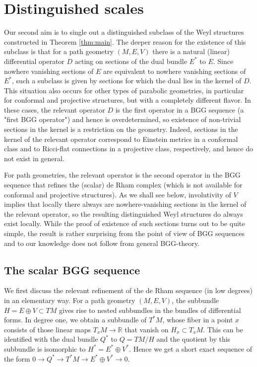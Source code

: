 \documentclass[11pt]{amsart}
\numberwithin{proposition}{section}
\numberwithin{equation}{section}
\begin{document}
\section{Distinguished scales}\label{distinguished}
Our second aim is to single out a distinguished subclass of the Weyl structures constructed in Theorem \ref{thm:main}. The deeper reason for the existence of this subclass is that for a path geometry $(M,E,V)$ there is a natural (linear) differential operator $D$ acting on sections of the dual bundle $E^*$ to $E$. Since nowhere vanishing sections of $E$ are equivalent to nowhere vanishing sections of $E^*$, such a subclass is given by sections for which the dual lies in the kernel of $D$. This situation also occurs for other types of parabolic geometries, in particular for conformal and projective structures, but with a completely different flavor. In these cases, the relevant operator $D$ is the first operator in a BGG sequence (a "first BGG operator") and hence is overdetermined, so existence of non-trivial sections in the kernel is a restriction on the geometry. Indeed, sections in the kernel of the relevant operator correspond to Einstein metrics in a conformal class and to Ricci-flat connections in a projective class, respectively, and hence do not exist in general. 

For path geometries, the relevant operator is the second operator in the BGG sequence that refines the (scalar) de Rham complex (which is not available for conformal and projective structures). As we shall see below, involutivity of $V$ implies that locally there always are nowhere-vanishing sections in the kernel of the relevant operator, so the resulting distinguished Weyl structures do always exist locally. While the proof of existence of such sections turns out to be quite simple, the result is rather surprising from the point of view of BGG sequences and to our knowledge does not follow from general BGG-theory. 

\subsection{The scalar BGG sequence}\label{BGG}
We first discuss the relevant refinement of the de Rham sequence (in low degrees) in an elementary way. For a path geometry $(M,E,V)$, the subbundle $H=E\oplus V\subset TM$ gives rise to nested subbundles in the bundles of differential forms. In degree one, we obtain a subbundle of $T^*M$, whose fiber in a point $x$ consists of those linear maps $T_xM\to\mathbb R$ that vanish on $H_x\subset T_xM$. This can be identified with the dual bundle $Q^*$ to $Q=TM/H$ and the quotient by this subbundle is isomorphic to $H^*=E^*\oplus V^*$. Hence we get a short exact sequence of the form $0\to Q^*\to T^*M\to E^*\oplus V^*\to 0$.  
\end{document}
